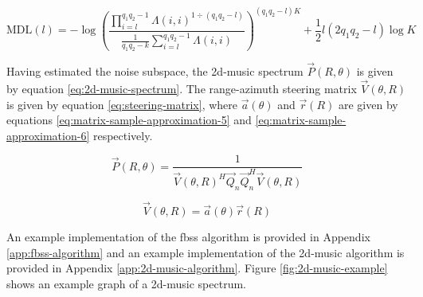 \begin{equation}
    \label{eq:music-mdl}
    \mathrm{MDL}(l) = - \log \left( 
        \frac
            {\prod\limits_{i = l}^{q_{1}q_{2}-1} \Lambda(i,i)^{1 \div (q_{1}q_{2} - l)}} 
            {\frac{1}{q_{1}q_{2}-k} \sum\limits_{i=l}^{q_{1}q_{2}-1} \Lambda(i,i)}
    \right)^{(q_{1}q_{2}-l)K} + \frac{1}{2}l(2q_{1}q_{2}-l) \log K
\end{equation}

Having estimated the noise subspace, the \gls{2d-music} spectrum $\vec{P}(R, \theta)$ is given by equation \ref{eq:2d-music-spectrum}.
The range-azimuth steering matrix $\vec{V}(\theta, R)$ is given by equation \ref{eq:steering-matrix},
where $\vec{a}(\theta)$ and $\vec{r}(R)$ are given by 
equations \ref{eq:matrix-sample-approximation-5} and \ref{eq:matrix-sample-approximation-6} respectively. \cite{music-based-algo}

\begin{equation}
    \label{eq:2d-music-spectrum}
    \vec{P}(R, \theta) = \frac{1}{ \vec{V}(\theta, R)^H \vec{Q}_{n} \vec{Q}_{n}^{H} \vec{V}(\theta, R) }
\end{equation}

\begin{equation}
    \label{eq:steering-matrix}
    \vec{V}(\theta, R) = \vec{a}(\theta) \vec{r}(R)
\end{equation}

An example implementation of the \gls{fbss} algorithm is provided in Appendix \ref{app:fbss-algorithm}
and an example implementation of the \gls{2d-music} algorithm is provided in Appendix \ref{app:2d-music-algorithm}.
Figure \ref{fig:2d-music-example} shows an example graph of a \gls{2d-music} spectrum.

